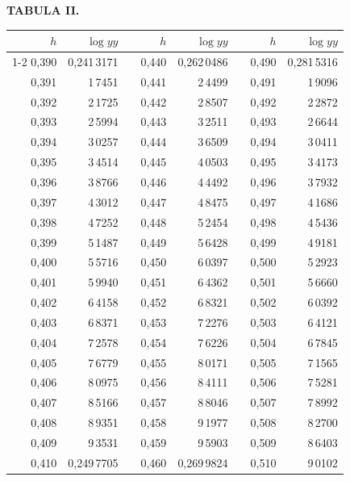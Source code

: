 \endgroup
\clearpage
{}
\begingroup
\centering
\fontsize{9}{9}\selectfont
\setlength{\tabcolsep}{8pt}
\renewcommand{\arraystretch}{1}
\setlength{\parskip}{0pt}
\textbf{TABULA II.}
\par\vspace{7pt}
\begin{tabular}{|r|r|@{}p{9pt}@{}|r|r|@{}p{9pt}@{}|r|r|}
\hline
\(h\) & \(\log yy\) & & \(h\) & \(\log yy\) & & \(h\) & \(\log yy\) \\
\cline{1-2}\cline{4-5}\cline{7-8}
0,390 & 0,241\,3171 &  & 0,440 & 0,262\,0486 &  & 0,490 & 0,281\,5316 \\
0,391 & 1\,7451 &  & 0,441 & 2\,4499 &  & 0,491 & 1\,9096 \\
0,392 & 2\,1725 &  & 0,442 & 2\,8507 &  & 0,492 & 2\,2872 \\
0,393 & 2\,5994 &  & 0,443 & 3\,2511 &  & 0,493 & 2\,6644 \\
0,394 & 3\,0257 &  & 0,444 & 3\,6509 &  & 0,494 & 3\,0411 \\
0,395 & 3\,4514 &  & 0,445 & 4\,0503 &  & 0,495 & 3\,4173 \\[3pt]
0,396 & 3\,8766 &  & 0,446 & 4\,4492 &  & 0,496 & 3\,7932 \\
0,397 & 4\,3012 &  & 0,447 & 4\,8475 &  & 0,497 & 4\,1686 \\
0,398 & 4\,7252 &  & 0,448 & 5\,2454 &  & 0,498 & 4\,5436 \\
0,399 & 5\,1487 &  & 0,449 & 5\,6428 &  & 0,499 & 4\,9181 \\
0,400 & 5\,5716 &  & 0,450 & 6\,0397 &  & 0,500 & 5\,2923 \\[3pt]
0,401 & 5\,9940 &  & 0,451 & 6\,4362 &  & 0,501 & 5\,6660 \\
0,402 & 6\,4158 &  & 0,452 & 6\,8321 &  & 0,502 & 6\,0392 \\
0,403 & 6\,8371 &  & 0,453 & 7\,2276 &  & 0,503 & 6\,4121 \\
0,404 & 7\,2578 &  & 0,454 & 7\,6226 &  & 0,504 & 6\,7845 \\
0,405 & 7\,6779 &  & 0,455 & 8\,0171 &  & 0,505 & 7\,1565 \\[3pt]
0,406 & 8\,0975 &  & 0,456 & 8\,4111 &  & 0,506 & 7\,5281 \\
0,407 & 8\,5166 &  & 0,457 & 8\,8046 &  & 0,507 & 7\,8992 \\
0,408 & 8\,9351 &  & 0,458 & 9\,1977 &  & 0,508 & 8\,2700 \\
0,409 & 9\,3531 &  & 0,459 & 9\,5903 &  & 0,509 & 8\,6403 \\
0,410 & 0,249\,7705 &  & 0,460 & 0,269\,9824 &  & 0,510 & 9\,0102 \\[3pt]

\end{tabular}
